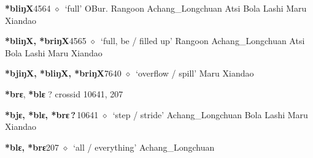   \begin{list}{}{\leftmargin=1.5em \itemindent=-1.5em}
  \item {\footnotesize \textbf{*bliŋX}}{\tiny 4564}
         $\diamond$~`full'
         OBur. 
\hspace{1ex}
         Rangoon 
\hspace{1ex}
         Achang\_Longchuan 
\hspace{1ex}
         Atsi 
\hspace{1ex}
         Bola 
\hspace{1ex}
         Lashi 
\hspace{1ex}
         Maru 
\hspace{1ex}
         Xiandao 
  \item {\footnotesize \textbf{*bliŋX, *briŋX}}{\tiny 4565}
\hspace{1ex}
         $\diamond$~`full, be / filled up'
         Rangoon 
\hspace{1ex}
         Achang\_Longchuan 
\hspace{1ex}
         Atsi 
\hspace{1ex}
         Bola 
\hspace{1ex}
         Lashi 
\hspace{1ex}
         Maru 
\hspace{1ex}
         Xiandao 
  \item {\footnotesize \textbf{*bjiŋX, *bliŋX, *briŋX}}{\tiny 7640}
\hspace{1ex}
         $\diamond$~`overflow / spill'
         Maru 
\hspace{1ex}
         Xiandao 
  \end{list}
\item
\textbf{*brɛ}, \textbf{*blɛ}
?
  {\tiny crossid 10641, 207}
  \begin{list}{}{\leftmargin=1.5em \itemindent=-1.5em}
  \item {\footnotesize \textbf{*bjɛ, *blɛ, *brɛ\,?\,}}{\tiny 10641}
         $\diamond$~`step / stride'
         Achang\_Longchuan 
\hspace{1ex}
         Bola 
\hspace{1ex}
         Lashi 
\hspace{1ex}
         Maru 
\hspace{1ex}
         Xiandao 
  \item {\footnotesize \textbf{*blɛ, *brɛ}}{\tiny 207}
\hspace{1ex}
         $\diamond$~`all / everything'
         Achang\_Longchuan 
  \end{list}
